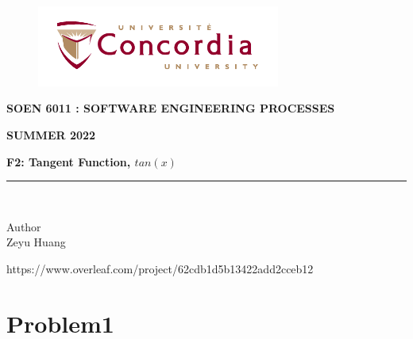 \documentclass[letterpaper, 11pt]{report}
\begin{document}
\begin{titlepage}
\vspace*{0.7in}
\begin{center}
\begin{figure}[htb]
\begin{center}
\includegraphics[width=8cm]{univ_logo}
\end{center}
\end{figure}
\vspace*{0.3in}
\begin{Large}
\textbf{SOEN 6011 : SOFTWARE ENGINEERING PROCESSES} \\
\end{Large}
\vspace*{0.1in}
\begin{Large}
\textbf{SUMMER 2022} \\
\end{Large}
\vspace*{0.9in}
\begin{Large}
\textbf{F2: Tangent Function, $tan(x)$} \\
\end{Large}
\vspace*{0.625in}
\rule{80mm}{0.1mm}\\
\vspace*{0.1in}
\begin{large}
Author \\
\vspace*{0.1in}
Zeyu Huang\\

\vspace*{0.3in}
\date{\normalsize\today} 
\end{large}
\end{center}
\begin{center}
https://www.overleaf.com/project/62cdb1d5b13422add2cceb12\end{center}
\end{titlepage}
\tableofcontents
\newpage
{}
\section*{Problem1}
\end{document}
